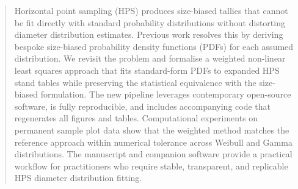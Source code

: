 \begin{abstract}
Horizontal point sampling (HPS) produces size-biased tallies that cannot be fit
directly with standard probability distributions without distorting diameter
distribution estimates. Previous work resolves this by deriving bespoke
size-biased probability density functions (PDFs) for each assumed distribution.
We revisit the problem and formalise a weighted non-linear least squares
approach that fits standard-form PDFs to expanded HPS stand tables while
preserving the statistical equivalence with the size-biased formulation. The
new pipeline leverages contemporary open-source software, is fully
reproducible, and includes accompanying code that regenerates all figures and
tables. Computational experiments on permanent sample plot data
show that the weighted method matches the reference approach within numerical
tolerance across Weibull and Gamma distributions. The manuscript and companion
software provide a practical workflow for practitioners who require stable,
transparent, and replicable HPS diameter distribution fitting.
\end{abstract}
